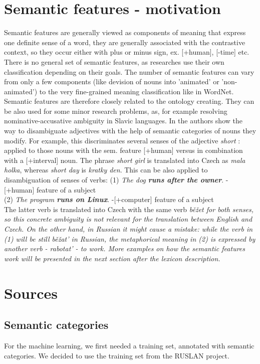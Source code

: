 \documentclass[letterpaper]{article}
\begin{document}
\section{Semantic features - motivation}
Semantic features are generally viewed as components of meaning
that express one definite sense of a word, they are generally associated
with the contrastive context, so they occur either with plus or minus
sign, ex. [+human], [-time] etc.
There is no general set of semantic features, as researches
use their own classification depending on their goals. The
number of semantic features can vary from only a few components (like
devision of nouns into 'animated' or 'non-animated') to the very
fine-grained meaning classification like in WordNet. Semantic features
are therefore closely related to the ontology creating.
They can be also used for some minor research problems, as, for example
resolving nominative-accusative ambiguity in Slavic languages.
In \cite{principled_disam} the authors show the way to disambiguate adjectives
with the help of semantic categories of nouns they modify. For example, 
this discriminates several senses of the  adjective \textit{short}
: applied to those nouns with the sem. feature [+human] versus in combination
with a [+interval] noun. The phrase \textit{short girl} is translated
into Czech as \textit{mala holka}, whereas \textit{short day} is \textit{kratky den}.
This can be also applied to disambiguation of senses of verbs: 
(1) \textit{The dog \bf{runs} after the owner}. - [+human] feature of a subject\\
(2) \textit{The program \bf{runs} on Linux}. -[+computer] feature of a subject \\
The latter verb is translated into Czech with the same verb \it{běžet}
for both senses, so this concrete ambiguity is not relevant for
the translation between English and Czech. On the other hand, in Russian
it might cause a mistake: while the verb in (1) will be still \it{běžat'} in Russian,
the metaphorical meaning in (2) is expressed by another verb - \it{rabotat'} - to work.
More examples on how the semantic features work will be presented in the next section
after the lexicon description.

\section{Sources}
\subsection{Semantic categories}
For the machine learning, we first needed a training set, annotated with semantic categories. We decided to use the training set from the RUSLAN project.
\end{document}
